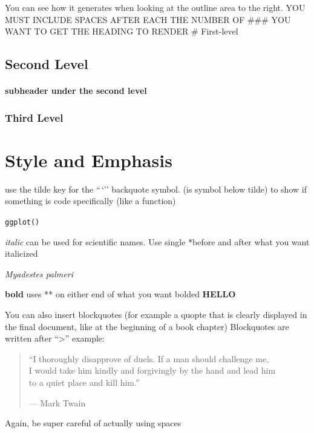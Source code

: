 \documentclass[
]{article}
\begin{document}
You can see how it generates when looking at the outline area to the
right. YOU MUST INCLUDE SPACES AFTER EACH THE NUMBER OF \#\#\# YOU WANT
TO GET THE HEADING TO RENDER \# First-level

\subsection{Second Level}\label{second-level}

\paragraph{subheader under the second
level}\label{subheader-under-the-second-level}

\subsubsection{Third Level}\label{third-level}

\section{Style and Emphasis}\label{style-and-emphasis}

use the tilde key for the ``\,`'' backquote symbol. (is symbol below
tilde) to show if something is code specifically (like a function)

\texttt{ggplot()}

\emph{italic} can be used for scientific names. Use single *before and
after what you want italicized

\emph{Myadestes palmeri}

\textbf{bold} uses ** on either end of what you want bolded
\textbf{HELLO}

You can also insert blockquotes (for example a quopte that is clearly
displayed in the final document, like at the beginning of a book
chapter) Blockquotes are written after ``\textgreater{}'' example:

\begin{quote}
``I thoroughly disapprove of duels. If a man should challenge me,\\
I would take him kindly and forgivingly by the hand and lead him\\
to a quiet place and kill him.''

--- Mark Twain
\end{quote}

Again, be super careful of actually using spaces
\end{document}
